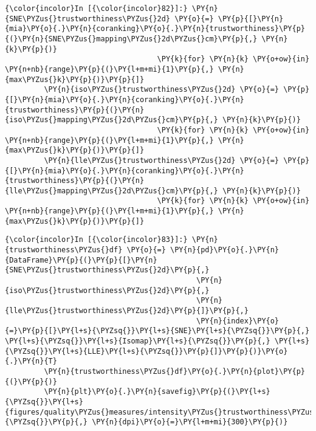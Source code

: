     \begin{Verbatim}[commandchars=\\\{\}]
{\color{incolor}In [{\color{incolor}82}]:} \PY{n}{SNE\PYZus{}trustworthiness\PYZus{}2d} \PY{o}{=} \PY{p}{[}\PY{n}{mia}\PY{o}{.}\PY{n}{coranking}\PY{o}{.}\PY{n}{trustworthiness}\PY{p}{(}\PY{n}{SNE\PYZus{}mapping\PYZus{}2d\PYZus{}cm}\PY{p}{,} \PY{n}{k}\PY{p}{)}
                                   \PY{k}{for} \PY{n}{k} \PY{o+ow}{in} \PY{n+nb}{range}\PY{p}{(}\PY{l+m+mi}{1}\PY{p}{,} \PY{n}{max\PYZus{}k}\PY{p}{)}\PY{p}{]}
         \PY{n}{iso\PYZus{}trustworthiness\PYZus{}2d} \PY{o}{=} \PY{p}{[}\PY{n}{mia}\PY{o}{.}\PY{n}{coranking}\PY{o}{.}\PY{n}{trustworthiness}\PY{p}{(}\PY{n}{iso\PYZus{}mapping\PYZus{}2d\PYZus{}cm}\PY{p}{,} \PY{n}{k}\PY{p}{)}
                                   \PY{k}{for} \PY{n}{k} \PY{o+ow}{in} \PY{n+nb}{range}\PY{p}{(}\PY{l+m+mi}{1}\PY{p}{,} \PY{n}{max\PYZus{}k}\PY{p}{)}\PY{p}{]}
         \PY{n}{lle\PYZus{}trustworthiness\PYZus{}2d} \PY{o}{=} \PY{p}{[}\PY{n}{mia}\PY{o}{.}\PY{n}{coranking}\PY{o}{.}\PY{n}{trustworthiness}\PY{p}{(}\PY{n}{lle\PYZus{}mapping\PYZus{}2d\PYZus{}cm}\PY{p}{,} \PY{n}{k}\PY{p}{)}
                                   \PY{k}{for} \PY{n}{k} \PY{o+ow}{in} \PY{n+nb}{range}\PY{p}{(}\PY{l+m+mi}{1}\PY{p}{,} \PY{n}{max\PYZus{}k}\PY{p}{)}\PY{p}{]}
\end{Verbatim}

    \begin{Verbatim}[commandchars=\\\{\}]
{\color{incolor}In [{\color{incolor}83}]:} \PY{n}{trustworthiness\PYZus{}df} \PY{o}{=} \PY{n}{pd}\PY{o}{.}\PY{n}{DataFrame}\PY{p}{(}\PY{p}{[}\PY{n}{SNE\PYZus{}trustworthiness\PYZus{}2d}\PY{p}{,}
                                            \PY{n}{iso\PYZus{}trustworthiness\PYZus{}2d}\PY{p}{,}
                                            \PY{n}{lle\PYZus{}trustworthiness\PYZus{}2d}\PY{p}{]}\PY{p}{,}
                                            \PY{n}{index}\PY{o}{=}\PY{p}{[}\PY{l+s}{\PYZsq{}}\PY{l+s}{SNE}\PY{l+s}{\PYZsq{}}\PY{p}{,} \PY{l+s}{\PYZsq{}}\PY{l+s}{Isomap}\PY{l+s}{\PYZsq{}}\PY{p}{,} \PY{l+s}{\PYZsq{}}\PY{l+s}{LLE}\PY{l+s}{\PYZsq{}}\PY{p}{]}\PY{p}{)}\PY{o}{.}\PY{n}{T}
         \PY{n}{trustworthiness\PYZus{}df}\PY{o}{.}\PY{n}{plot}\PY{p}{(}\PY{p}{)}
         \PY{n}{plt}\PY{o}{.}\PY{n}{savefig}\PY{p}{(}\PY{l+s}{\PYZsq{}}\PY{l+s}{figures/quality\PYZus{}measures/intensity\PYZus{}trustworthiness\PYZus{}2d.png}\PY{l+s}{\PYZsq{}}\PY{p}{,} \PY{n}{dpi}\PY{o}{=}\PY{l+m+mi}{300}\PY{p}{)}
\end{Verbatim}

